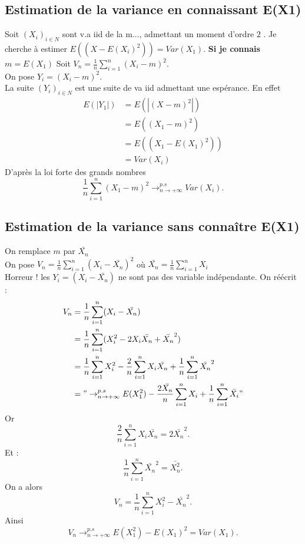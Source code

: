 \documentclass{article}
\theoremstyle{plain}%
\theoremstyle{definition}
\theoremstyle{remark}
\begin{document}
\subsection{Estimation de la variance en connaissant E(X1)}
Soit $ (X_i)_{i \in N} $ sont v.a iid de la m..., admettant un moment d'ordre $ 2 $ . Je cherche à estimer $ E((X-E(X_i)^2)) = Var(X_1) $. \textbf{Si je connais $ m=E(X_1) $ } Soit $ V_n = \frac{1}{n}\sum_{i=1}^{n}(X_i - m)^2 $.\\
On pose $ Y_i = (X_i - m )^2 $. \\
La suite $ (Y_i)_{i \in N} $ est une suite de va iid admettant une espérance. En effet \begin{align*}
    E(\left| Y_1 \right| ) &= E(\left| (X-m)^2 \right| )\\
                        &= E((X_1-m)^2) \\
                        &= E((X_1 - E(X_1)^2)) \\
                        &= Var (X_i)
\end{align*}
D'après la loi forte des grands nombres 
\[
    \frac{1}{n}\sum_{i=1}^{n}(X_1 - m)^2 \to^{p.s}_{n \to +\infty}Var(X_i)
.\]

\subsection{Estimation de la variance sans connaître E(X1)}
On remplace $ m $ par $ \bar{X_n} $ \\
On pose $ V_n = \frac{1}{n}\sum_{i=1}^{n}(X_i - \bar{X_n})^2 $ où $ \bar{X_n} = \frac{1}{n}\sum_{i=1}^{n}X_i $  \\
Horreur ! les $ Y_i = (X_i - \bar{X_n}) $ ne sont pas des variable indépendante. On réécrit : \begin{align*}
    V_n &= \frac{1}{n}\sum_{i=1}^{n}(X_i-\bar{X_n}) \\
        &= \frac{1}{n}\sum_{i=1}^{n}(X_i^2 - 2X_i \bar{X_n} + \bar{X_n}^2) \\
        &= \frac{1}{n}\sum_{i=1}^{n}X_i^2 - \frac{2}{n}\sum_{i=1}^{n} X_i \bar{X_n} + \frac{1}{n}\sum_{i=1}^{n}\bar{X_n}^2 \\
        &= "\to^{p.s}_{n \to +\infty} E(X_1^2) - \frac{2 \bar{X_n}}{n} \sum_{i=1}^{n}X_i + \frac{1}{n}\sum_{i=1}^{n}\bar{X_i}"
\end{align*}
Or 
\[
    \frac{2}{n}\sum_{i=1}^{n}X_i \bar{X_n} = 2 \bar{X_n}^2
.\]
Et : 
\[
    \frac{1}{n}\sum_{i=1}^{n}\bar{X_n}^2 =\bar{X_n^2}
.\]
On a alors 
\[
    V_n = \frac{1}{n}\sum_{i=1}^{n}X_i^2 - \bar{X_n}^2
.\]
Ainsi 
\[
    V_n \to^{p.s}_{n \to +\infty} E(X_1^2) - E(X_1) ^2 = Var(X_1)
.\]
\end{document}
